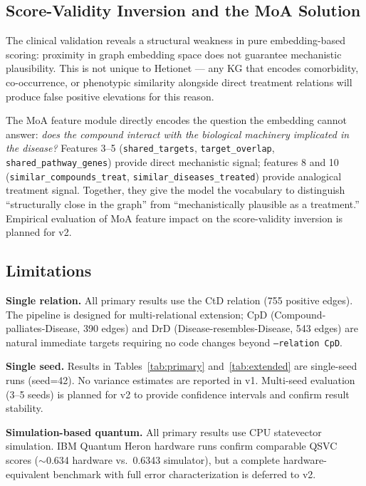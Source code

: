 \documentclass[twocolumn,10pt]{article}
\begin{document}
\subsection{Score-Validity Inversion and the MoA Solution}

The clinical validation reveals a structural weakness in pure embedding-based scoring: proximity in graph embedding space does not guarantee mechanistic plausibility. This is not unique to Hetionet --- any KG that encodes comorbidity, co-occurrence, or phenotypic similarity alongside direct treatment relations will produce false positive elevations for this reason.

The MoA feature module directly encodes the question the embedding cannot answer: \textit{does the compound interact with the biological machinery implicated in the disease?} Features 3--5 (\texttt{shared\_targets}, \texttt{target\_overlap}, \texttt{shared\_pathway\_genes}) provide direct mechanistic signal; features 8 and 10 (\texttt{similar\_compounds\_treat}, \texttt{similar\_diseases\_treated}) provide analogical treatment signal. Together, they give the model the vocabulary to distinguish ``structurally close in the graph'' from ``mechanistically plausible as a treatment.'' Empirical evaluation of MoA feature impact on the score-validity inversion is planned for v2.

\subsection{Limitations}

\textbf{Single relation.} All primary results use the CtD relation (755 positive edges). The pipeline is designed for multi-relational extension; CpD (Compound-palliates-Disease, 390 edges) and DrD (Disease-resembles-Disease, 543 edges) are natural immediate targets requiring no code changes beyond \texttt{--relation CpD}.

\textbf{Single seed.} Results in Tables~\ref{tab:primary} and~\ref{tab:extended} are single-seed runs (seed=42). No variance estimates are reported in v1. Multi-seed evaluation (3--5 seeds) is planned for v2 to provide confidence intervals and confirm result stability.

\textbf{Simulation-based quantum.} All primary results use CPU statevector simulation. IBM Quantum Heron hardware runs confirm comparable QSVC scores (${\sim}$0.634 hardware vs.\ 0.6343 simulator), but a complete hardware-equivalent benchmark with full error characterization is deferred to v2.
\end{document}
